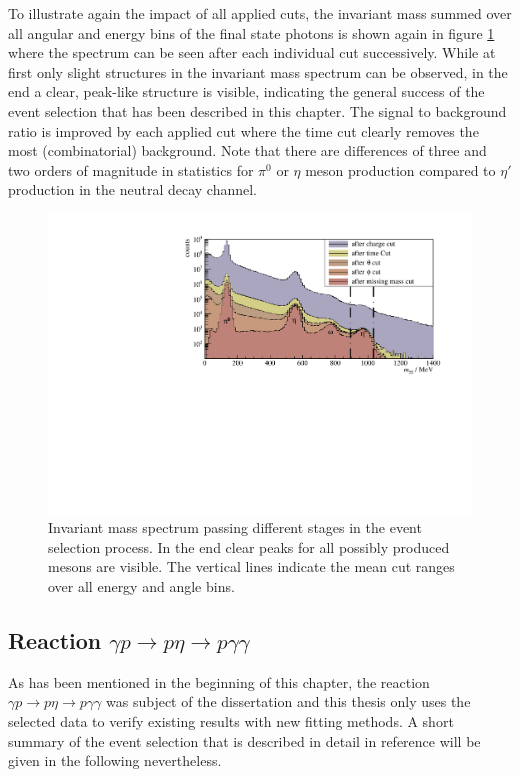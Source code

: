 To illustrate again the impact of all applied cuts, the invariant mass summed over all angular and energy bins of the final state photons is shown again in figure \ref{fig:invm_pretty} where the spectrum can be seen after each individual cut successively. While at first only slight structures in the invariant mass spectrum can be observed, in the end a clear, peak-like structure is visible, indicating the general success of the event selection that has been described in this chapter. The signal to background ratio is improved by each applied cut where the time cut clearly removes the most (combinatorial) background. Note that there are differences of three and two orders of magnitude in statistics for $\pi^0$ or $\eta$ meson production compared to $\eta'$ production in the neutral decay channel. 
\begin{figure}[t]
	\centering
	\includegraphics[width=\linewidth]{../figs/hydrogen/inv_mass_pretty.pdf}
	\caption{Invariant mass spectrum passing different stages in the event selection process. In the end clear peaks for all possibly produced mesons are visible. The vertical lines indicate the mean cut ranges over all energy and angle bins.}
	\label{fig:invm_pretty}
\end{figure}
\subsection{Reaction $\gamma p\to p\eta\to p\gamma\gamma$}
As has been mentioned in the beginning of this chapter, the reaction $\gamma p \to p\eta\to p\gamma\gamma$ was subject of the dissertation \cite{farahphd} and this thesis only uses the selected data to verify existing results with new fitting methods. A short summary of the event selection that is described in detail in reference \cite{farahphd} will be given in the following nevertheless.

